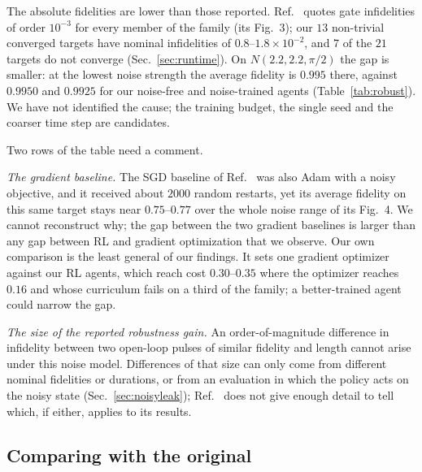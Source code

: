 \documentclass[aps,prx,twocolumn,superscriptaddress,nofootinbib,amsmath,amssymb,floatfix]{revtex4-2}
\newcommand{\Ntgt}[2]{N(#1,#1,#2)}
\begin{document}
The absolute fidelities are lower than those reported. Ref.~\cite{Niu2019} quotes gate infidelities of
order $10^{-3}$ for every member of the family (its Fig.~3); our $13$ non-trivial converged targets have
nominal infidelities of $0.8$--$1.8\times10^{-2}$, and $7$ of the $21$ targets do not converge
(Sec.~\ref{sec:runtime}). On $\Ntgt{2.2}{\pi/2}$ the gap is smaller: at the lowest noise strength the
average fidelity is $0.995$ there, against $0.9950$ and $0.9925$ for our noise-free and noise-trained
agents (Table~\ref{tab:robust}). We have not identified the cause; the training budget, the single seed
and the coarser time step are candidates.

Two rows of the table need a comment.

\emph{The gradient baseline.} The SGD baseline of Ref.~\cite{Niu2019} was also Adam with a noisy
objective, and it received about $2000$ random restarts, yet its average fidelity on this same target
stays near $0.75$--$0.77$ over the whole noise range of its Fig.~4. We cannot reconstruct why; the gap
between the two gradient baselines is larger than any gap between RL and gradient optimization that we
observe. Our own comparison is the least general of our findings. It sets one gradient optimizer against
our RL agents, which reach cost $0.30$--$0.35$ where the optimizer reaches $0.16$ and whose curriculum
fails on a third of the family; a better-trained agent could narrow the gap.

\emph{The size of the reported robustness gain.} An order-of-magnitude difference in infidelity between
two open-loop pulses of similar fidelity and length cannot arise under this noise model. Differences of
that size can only come from different nominal fidelities or durations, or from an evaluation in which the
policy acts on the noisy state (Sec.~\ref{sec:noisyleak}); Ref.~\cite{Niu2019} does not give enough detail
to tell which, if either, applies to its results.

\subsection{Comparing with the original}
\label{sec:noisescales}
\end{document}
